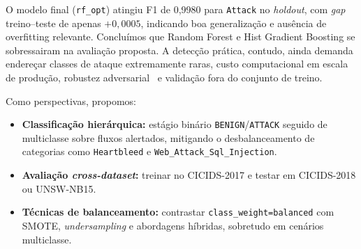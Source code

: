 \documentclass[12pt]{article}
\makeatletter
\newlength{\sbcblockmargin}
\newenvironment{sbcnarrowblock}{%
  \list{}{%
    \topsep\z@
    \partopsep\z@
    \itemsep\z@
    \parsep\z@
    \leftmargin=\sbcblockmargin
    \rightmargin=\sbcblockmargin
    \listparindent=\parindent
    \itemindent=\z@
    \labelwidth=\z@
    \labelsep=\z@
  }\item\relax}
{\endlist}
\makeatother
\begin{document}
\begin{sbcnarrowblock}
O modelo final (\texttt{rf\_opt}) atingiu F1 de 0,9980 para \texttt{Attack} no \textit{holdout}, com \textit{gap} treino--teste de apenas $+0{,}0005$, indicando boa generalização e ausência de overfitting relevante.
Concluímos que Random Forest e Hist Gradient Boosting se sobressairam na avaliação proposta.
A detecção prática, contudo, ainda demanda endereçar classes de ataque extremamente raras, custo computacional em escala de produção, robustez adversarial~\cite{he2023adversarial} e validação fora do conjunto de treino.

Como perspectivas, propomos:
\begin{itemize}
  \item \textbf{Classificação hierárquica:} estágio binário \texttt{BENIGN}/\texttt{ATTACK} seguido de multiclasse sobre fluxos alertados, mitigando o desbalanceamento de categorias como \texttt{Heartbleed} e \texttt{Web\_Attack\_Sql\_Injection}.
  \item \textbf{Avaliação \textit{cross-dataset}:} treinar no CICIDS-2017 e testar em CICIDS-2018 ou UNSW-NB15.
  \item \textbf{Técnicas de balanceamento:} contrastar \texttt{class\_weight=balanced} com SMOTE, \textit{undersampling} e abordagens híbridas, sobretudo em cenários multiclasse.
\end{itemize}




\end{sbcnarrowblock}
\end{document}
